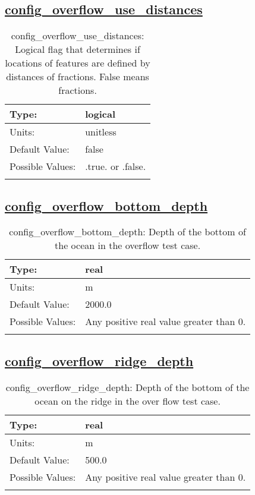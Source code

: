 \subsection[config\_overflow\_use\_distances]{\hyperref[sec:nm_tab_overflow]{config\_overflow\_use\_distances}}
\label{subsec:nm_sec_config_overflow_use_distances}
\begin{center}
\begin{longtable}{| p{2.0in} || p{4.0in} |}
    \hline
    Type: & logical \\
    \hline
    Units: & \si{unitless} \\
    \hline
    Default Value: & false \\
    \hline
    Possible Values: & .true. or .false. \\
    \hline
    \caption{config\_overflow\_use\_distances: Logical flag that determines if locations of features are defined by distances of fractions. False means fractions.}
\end{longtable}
\end{center}
\subsection[config\_overflow\_bottom\_depth]{\hyperref[sec:nm_tab_overflow]{config\_overflow\_bottom\_depth}}
\label{subsec:nm_sec_config_overflow_bottom_depth}
\begin{center}
\begin{longtable}{| p{2.0in} || p{4.0in} |}
    \hline
    Type: & real \\
    \hline
    Units: & \si{m} \\
    \hline
    Default Value: & 2000.0 \\
    \hline
    Possible Values: & Any positive real value greater than 0. \\
    \hline
    \caption{config\_overflow\_bottom\_depth: Depth of the bottom of the ocean in the overflow test case.}
\end{longtable}
\end{center}
\subsection[config\_overflow\_ridge\_depth]{\hyperref[sec:nm_tab_overflow]{config\_overflow\_ridge\_depth}}
\label{subsec:nm_sec_config_overflow_ridge_depth}
\begin{center}
\begin{longtable}{| p{2.0in} || p{4.0in} |}
    \hline
    Type: & real \\
    \hline
    Units: & \si{m} \\
    \hline
    Default Value: & 500.0 \\
    \hline
    Possible Values: & Any positive real value greater than 0. \\
    \hline
    \caption{config\_overflow\_ridge\_depth: Depth of the bottom of the ocean on the ridge in the over flow test case.}
\end{longtable}
\end{center}
